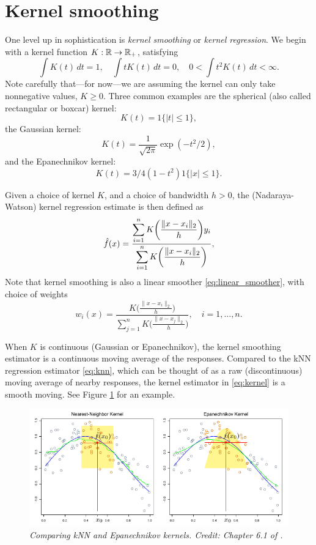\documentclass{article}
\begin{document}
\section{Kernel smoothing}

One level up in sophistication is \emph{kernel smoothing} or \emph{kernel 
  regression}. We begin with a kernel function $K : \mathbb{R} \to \mathbb{R}_+$, satisfying    
\[
\int K(t) \, dt = 1, \quad
\int t K(t) \, dt = 0, \quad
0 < \int t^2 K(t) \, dt < \infty.
\]
Note carefully that---for now---we are assuming the kernel can only take
nonnegative values, $K \geq 0$. Three common examples are the spherical (also
called rectangular or boxcar) kernel: 
\[
K(t) = 1\{|t| \leq 1\},
\]
the Gaussian kernel:
\[
K(t) = \frac{1}{\sqrt{2\pi}} \exp(-t^2/2),
\]
and the Epanechnikov kernel:
\[
K(t) = 3/4 (1-t^2) 1\{|x| \leq 1\}.
\]

Given a choice of kernel $K$, and a choice of bandwidth $h>0$, the
(Nadaraya-Watson) kernel regression estimate is then defined as
\begin{equation}
\label{eq:kernel}
\hat{f}(x) = 
\frac{\displaystyle \sum_{i=1}^n K\bigg( \frac{\|x-x_i\|_2}{h} \bigg)  y_i}  
{\displaystyle \sum_{i=1}^n K\bigg( \frac{\|x-x_i\|_2}{h} \bigg)}, 
\end{equation}
Note that kernel smoothing is also a linear smoother \eqref{eq:linear_smoother},
with choice of weights  
\[
w_i(x) = 
\frac{\displaystyle K\bigg ( \frac{\|x-x_i\|_2}{h} \bigg)}
{\displaystyle \sum_{j=1}^n K\bigg ( \frac{\|x-x_j\|_2}{h} \bigg)},
\quad i=1,\dots,n. 
\]

When $K$ is continuous (Gaussian or Epanechnikov), the kernel smoothing
estimator is a continuous moving average of the responses. Compared to the kNN
regression estimator \eqref{eq:knn}, which can be thought of as a raw 
(discontinuous) moving average of nearby responses, the kernel estimator in 
\eqref{eq:kernel} is a smooth moving. See Figure \ref{fig:kernel} for an example.

\begin{figure}[tb]
\centering
\includegraphics[width=\textwidth]{kernels.pdf}
\caption{\it Comparing kNN and Epanechnikov kernels. Credit: Chapter 6.1 of 
  \citet{hastie2009elements}.}      
\label{fig:kernel}
\end{figure}
\end{document}
